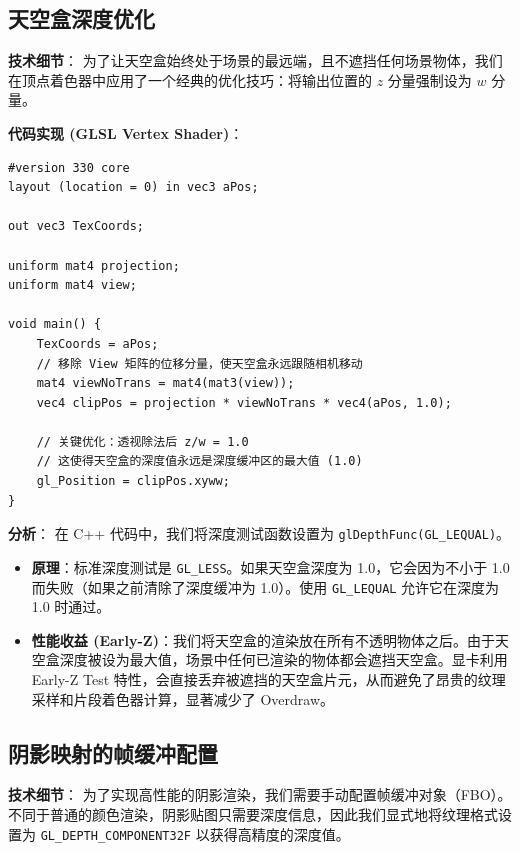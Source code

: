 \documentclass[a4paper]{article}
\begin{document}
\subsection{天空盒深度优化}

\textbf{技术细节}：
为了让天空盒始终处于场景的最远端，且不遮挡任何场景物体，我们在顶点着色器中应用了一个经典的优化技巧：将输出位置的 $z$ 分量强制设为 $w$ 分量。

\textbf{代码实现 (GLSL Vertex Shader)}：
\begin{lstlisting}[caption={天空盒顶点着色器优化}]
#version 330 core
layout (location = 0) in vec3 aPos;

out vec3 TexCoords;

uniform mat4 projection;
uniform mat4 view;

void main() {
    TexCoords = aPos;
    // 移除 View 矩阵的位移分量，使天空盒永远跟随相机移动
    mat4 viewNoTrans = mat4(mat3(view)); 
    vec4 clipPos = projection * viewNoTrans * vec4(aPos, 1.0);
    
    // 关键优化：透视除法后 z/w = 1.0
    // 这使得天空盒的深度值永远是深度缓冲区的最大值 (1.0)
    gl_Position = clipPos.xyww; 
}
\end{lstlisting}

\textbf{分析}：
在 C++ 代码中，我们将深度测试函数设置为 \texttt{glDepthFunc(GL\_LEQUAL)}。
\begin{itemize}
    \item \textbf{原理}：标准深度测试是 \texttt{GL\_LESS}。如果天空盒深度为 1.0，它会因为不小于 1.0 而失败（如果之前清除了深度缓冲为 1.0）。使用 \texttt{GL\_LEQUAL} 允许它在深度为 1.0 时通过。
    \item \textbf{性能收益 (Early-Z)}：我们将天空盒的渲染放在所有不透明物体之后。由于天空盒深度被设为最大值，场景中任何已渲染的物体都会遮挡天空盒。显卡利用 Early-Z Test 特性，会直接丢弃被遮挡的天空盒片元，从而避免了昂贵的纹理采样和片段着色器计算，显著减少了 Overdraw。
\end{itemize}

\subsection{阴影映射的帧缓冲配置}

\textbf{技术细节}：
为了实现高性能的阴影渲染，我们需要手动配置帧缓冲对象（FBO）。不同于普通的颜色渲染，阴影贴图只需要深度信息，因此我们显式地将纹理格式设置为 \texttt{GL\_DEPTH\_COMPONENT32F} 以获得高精度的深度值。
\end{document}
